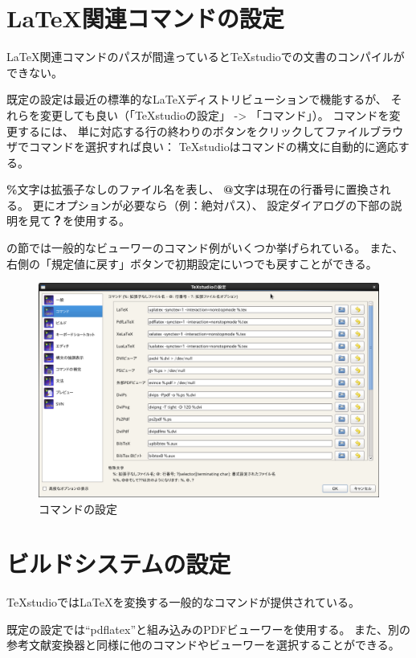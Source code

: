 \section{LaTeX関連コマンドの設定}

LaTeX関連コマンドのパスが間違っているとTeXstudioでの文書のコンパイルができない。

既定の設定は最近の標準的なLaTeXディストリビューションで機能するが、
それらを変更しても良い（「TeXstudioの設定」 -\textgreater{} 「コマンド」）。
コマンドを変更するには、
単に対応する行の終わりのボタンをクリックしてファイルブラウザでコマンドを選択すれば良い：
TeXstudioはコマンドの構文に自動的に適応する。

\textbf{\%}文字は拡張子なしのファイル名を表し、
\textbf{@}文字は現在の行番号に置換される。
更にオプションが必要なら（例：絶対パス）、
設定ダイアログの下部の説明を見て\textbf{？}を使用する。

の節では一般的なビューワーのコマンド例がいくつか挙げられている。
また、右側の「規定値に戻す」ボタンで初期設定にいつでも戻すことができる。

\begin{figure}[H]
  \centering
  \includegraphics[width=.8\linewidth]{configure_commands.png}
  \caption{コマンドの設定}
\end{figure}

\section{ビルドシステムの設定}

TeXstudioではLaTeXを変換する一般的なコマンドが提供されている。

既定の設定では``pdflatex''と組み込みのPDFビューワーを使用する。
また、別の参考文献変換器と同様に他のコマンドやビューワーを選択することができる。

